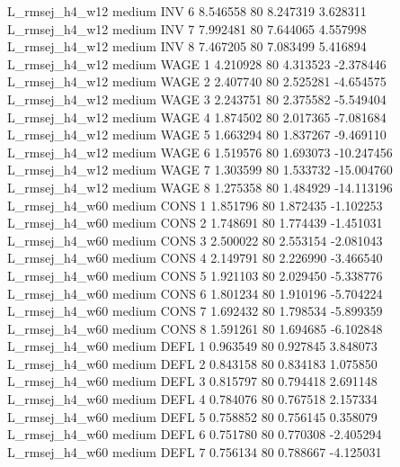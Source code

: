 L_rmsej_h4_w12     medium      INV                 6  8.546558 80       8.247319           3.628311
L_rmsej_h4_w12     medium      INV                 7  7.992481 80       7.644065           4.557998
L_rmsej_h4_w12     medium      INV                 8  7.467205 80       7.083499           5.416894
L_rmsej_h4_w12     medium     WAGE                 1  4.210928 80       4.313523          -2.378446
L_rmsej_h4_w12     medium     WAGE                 2  2.407740 80       2.525281          -4.654575
L_rmsej_h4_w12     medium     WAGE                 3  2.243751 80       2.375582          -5.549404
L_rmsej_h4_w12     medium     WAGE                 4  1.874502 80       2.017365          -7.081684
L_rmsej_h4_w12     medium     WAGE                 5  1.663294 80       1.837267          -9.469110
L_rmsej_h4_w12     medium     WAGE                 6  1.519576 80       1.693073         -10.247456
L_rmsej_h4_w12     medium     WAGE                 7  1.303599 80       1.533732         -15.004760
L_rmsej_h4_w12     medium     WAGE                 8  1.275358 80       1.484929         -14.113196
L_rmsej_h4_w60     medium     CONS                 1  1.851796 80       1.872435          -1.102253
L_rmsej_h4_w60     medium     CONS                 2  1.748691 80       1.774439          -1.451031
L_rmsej_h4_w60     medium     CONS                 3  2.500022 80       2.553154          -2.081043
L_rmsej_h4_w60     medium     CONS                 4  2.149791 80       2.226990          -3.466540
L_rmsej_h4_w60     medium     CONS                 5  1.921103 80       2.029450          -5.338776
L_rmsej_h4_w60     medium     CONS                 6  1.801234 80       1.910196          -5.704224
L_rmsej_h4_w60     medium     CONS                 7  1.692432 80       1.798534          -5.899359
L_rmsej_h4_w60     medium     CONS                 8  1.591261 80       1.694685          -6.102848
L_rmsej_h4_w60     medium     DEFL                 1  0.963549 80       0.927845           3.848073
L_rmsej_h4_w60     medium     DEFL                 2  0.843158 80       0.834183           1.075850
L_rmsej_h4_w60     medium     DEFL                 3  0.815797 80       0.794418           2.691148
L_rmsej_h4_w60     medium     DEFL                 4  0.784076 80       0.767518           2.157334
L_rmsej_h4_w60     medium     DEFL                 5  0.758852 80       0.756145           0.358079
L_rmsej_h4_w60     medium     DEFL                 6  0.751780 80       0.770308          -2.405294
L_rmsej_h4_w60     medium     DEFL                 7  0.756134 80       0.788667          -4.125031
